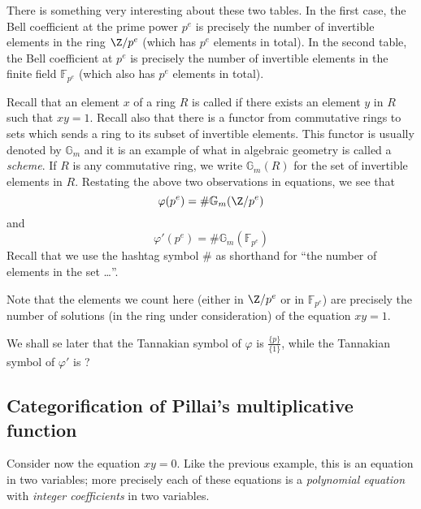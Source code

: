 There is something very interesting about these two tables. In the first case, the Bell coefficient at the prime power $p^e$ is precisely the number of invertible elements in the ring $\Z / p^e$ (which has $p^e$ elements in total). In the second table, the Bell coefficient at $p^e$ is precisely the number of invertible elements in the finite field $\mathbb{F}_{p^e}$ (which also has $p^e$ elements in total). 

Recall that an element $x$ of a ring $R$ is called  if there exists an element $y$ in $R$ such that $xy = 1$. Recall also that there is a functor from commutative rings to sets which sends a ring to its subset of invertible elements. This functor is usually denoted by $\mathbb{G}_m$ and it is an example of what in algebraic geometry is called a \emph{scheme}. If $R$ is any commutative ring, we write $\mathbb{G}_m(R)$ for the set of invertible elements in $R$. Restating the above two observations in equations, we see that
$$  \varphi(p^e) = \# \mathbb{G}_m(\Z / p^e)  $$
and 
$$  \varphi'(p^e) = \# \mathbb{G}_m(\mathbb{F}_{p^e})  $$
Recall that we use the hashtag symbol $\#$ as shorthand for ``the number of elements in the set \ldots''.

Note that the elements we count here (either in $\Z / p^e$ or in $\mathbb{F}_{p^e}$) are precisely the number of solutions (in the ring under consideration) of the equation $xy = 1$.


\begin{remark}
We shall se later that the Tannakian symbol of $\varphi$ is $\frac{ \{ p \} }{ \{ 1 \}  }$, while the Tannakian symbol of $\varphi'$ is ?
\end{remark}


\subsection{Categorification of Pillai's multiplicative function}

Consider now the equation $xy = 0$. Like the previous example, this is an equation in two variables; more precisely each of these equations is a \emph{polynomial equation} with \emph{integer coefficients} in two variables.



